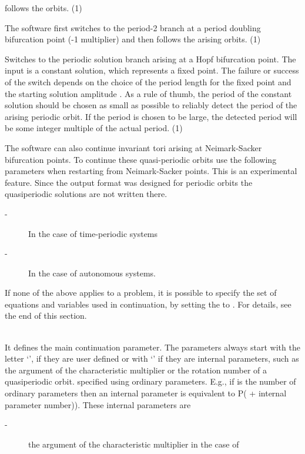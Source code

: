 \documentclass[10pt,a4paper]{ddedoc}
\begin{document}
\begin{description}
\begin{description}
follows the orbits. (1)
%
\item[\funp{55} -] The software first switches to the period-2 branch at a
period doubling bifurcation point
(-1 multiplier) and then follows the arising orbits. (1)
%
\item[\funp{56} -] Switches to the periodic solution branch arising at a Hopf
bifurcation point. The input is a constant solution, which represents a fixed
point. The failure or success of the switch depends on the choice of the period
length for the fixed point and the starting solution amplitude .
As a rule of thumb, the period of the constant solution should be chosen as
small as possible to reliably detect the period of the arising periodic orbit.
If the period is chosen to be large, the detected period will be some integer
multiple of the actual period. (1)
\end{description}
The software can also continue invariant tori arising at Neimark-Sacker
bifurcation points. To continue these quasi-periodic orbits use the following
parameters when restarting from Neimark-Sacker points. This is an experimental
feature. Since the output format was designed for periodic orbits the
quasiperiodic solutions are not written there.
\begin{description}
\item[ -] In the case of time-periodic systems
%
\item[ -] In the case of autonomous systems.
\end{description}
If none of the above applies to a problem, it is possible to specify the set of
equations and variables used in continuation, by setting the  to
. For details, see the end of this section.
%
\item[\funp{CP}] ~\\
It defines the main continuation parameter. The parameters always start with the
letter `', if they are user defined or with `' if they are
internal parameters, such as the argument of the characteristic multiplier or
the rotation number of a quasiperiodic orbit.
specified using ordinary parameters. E.g., if  is the number of
ordinary parameters then an internal parameter is equivalent to P( +
internal parameter number)). 
These  internal parameters are
\begin{description}
\item[ -] the argument of the characteristic multiplier in the case of

\end{description}
\end{description}
\end{document}
